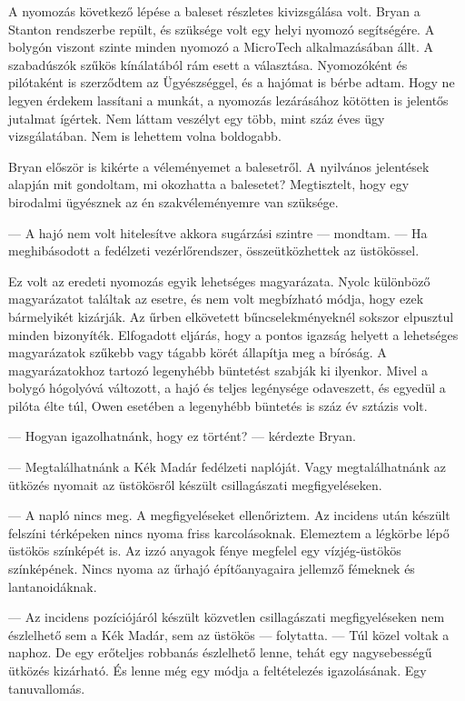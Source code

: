 \documentclass[10pt]{memoir}
\begin{document}
A nyomozás következő lépése a baleset részletes kivizsgálása volt. Bryan a
Stanton rendszerbe repült, és szüksége volt egy helyi nyomozó segítségére. A
bolygón viszont szinte minden nyomozó a MicroTech alkalmazásában állt. A
szabadúszók szűkös kínálatából rám esett a választása. Nyomozóként és
pilótaként is szerződtem az Ügyészséggel, és a hajómat is bérbe adtam. Hogy ne
legyen érdekem lassítani a munkát, a nyomozás lezárásához kötötten is jelentős
jutalmat ígértek. Nem láttam veszélyt egy több, mint száz éves ügy
vizsgálatában. Nem is lehettem volna boldogabb.

Bryan először is kikérte a véleményemet a balesetről. A nyilvános jelentések
alapján mit gondoltam, mi okozhatta a balesetet? Megtisztelt, hogy egy
birodalmi ügyésznek az én szakvéleményemre van szüksége.

— A hajó nem volt hitelesítve akkora sugárzási szintre — mondtam. — Ha
meghibásodott a fedélzeti vezérlőrendszer, összeütközhettek az üstökössel.

Ez volt az eredeti nyomozás egyik lehetséges magyarázata. Nyolc különböző
magyarázatot találtak az esetre, és nem volt megbízható módja, hogy ezek
bármelyikét kizárják. Az űrben elkövetett bűncselekményeknél sokszor elpusztul
minden bizonyíték. Elfogadott eljárás, hogy a pontos igazság helyett a
lehetséges magyarázatok szűkebb vagy tágabb körét állapítja meg a bíróság. A
magyarázatokhoz tartozó legenyhébb büntetést szabják ki ilyenkor. Mivel a
bolygó hógolyóvá változott, a hajó és teljes legénysége odaveszett, és egyedül
a pilóta élte túl, Owen esetében a legenyhébb büntetés is száz év sztázis volt.

— Hogyan igazolhatnánk, hogy ez történt? — kérdezte Bryan.

— Megtalálhatnánk a Kék Madár fedélzeti naplóját. Vagy megtalálhatnánk az
ütközés nyomait az üstökösről készült csillagászati megfigyeléseken.

— A napló nincs meg. A megfigyeléseket ellenőriztem. Az incidens után készült
felszíni térképeken nincs nyoma friss karcolásoknak. Elemeztem a légkörbe lépő
üstökös színképét is. Az izzó anyagok fénye megfelel egy vízjég-üstökös
színképének. Nincs nyoma az űrhajó építőanyagaira jellemző fémeknek és
lantanoidáknak.

— Az incidens pozíciójáról készült közvetlen csillagászati megfigyeléseken nem
észlelhető sem a Kék Madár, sem az üstökös — folytatta. — Túl közel voltak a
naphoz. De egy erőteljes robbanás észlelhető lenne, tehát egy nagysebességű
ütközés kizárható. És lenne még egy módja a feltételezés igazolásának. Egy
tanuvallomás.
\end{document}
